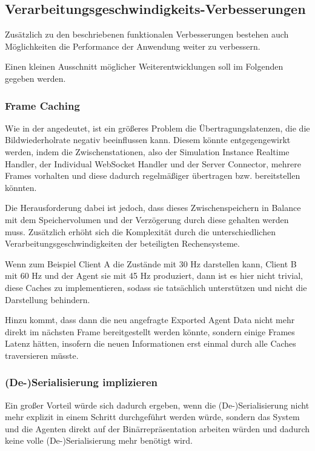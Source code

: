 \subsection{Verarbeitungsgeschwindigkeits-Verbesserungen}

Zusätzlich zu den beschriebenen funktionalen Verbesserungen bestehen auch Möglichkeiten die Performance der Anwendung weiter zu verbessern.

Einen kleinen Ausschnitt möglicher Weiterentwicklungen soll im Folgenden gegeben werden.

\subsubsection{Frame Caching}

Wie in der  angedeutet, ist ein größeres Problem die Übertragungslatenzen, die die Bildwiederholrate negativ beeinflussen kann.
Diesem könnte entgegengewirkt werden, indem die Zwischenstationen, also der Simulation Instance Realtime Handler, der Individual WebSocket Handler und der Server Connector, mehrere Frames vorhalten und diese dadurch regelmäßiger übertragen bzw. bereitstellen könnten.

Die Herausforderung dabei ist jedoch, dass dieses Zwischenspeichern in Balance mit dem Speichervolumen und der Verzögerung durch diese gehalten werden muss.
Zusätzlich erhöht sich die Komplexität durch die unterschiedlichen Verarbeitungsgeschwindigkeiten der beteiligten Rechensysteme.

Wenn zum Beispiel Client A die Zustände mit 30 Hz darstellen kann, Client B mit 60 Hz und der Agent sie mit 45 Hz produziert, dann ist es hier nicht trivial, diese Caches zu implementieren, sodass sie tatsächlich unterstützen und nicht die Darstellung behindern.

Hinzu kommt, dass dann die neu angefragte Exported Agent Data nicht mehr direkt im nächsten Frame bereitgestellt werden könnte, sondern einige Frames Latenz hätten, insofern die neuen Informationen erst einmal durch alle Caches traversieren müsste.

\subsubsection{(De-)Serialisierung implizieren}

Ein großer Vorteil würde sich dadurch ergeben, wenn die (De-)Serialisierung nicht mehr explizit in einem Schritt durchgeführt werden würde, sondern das System und die Agenten direkt auf der Binärrepräsentation arbeiten würden und dadurch keine volle (De-)Serialisierung mehr benötigt wird.

